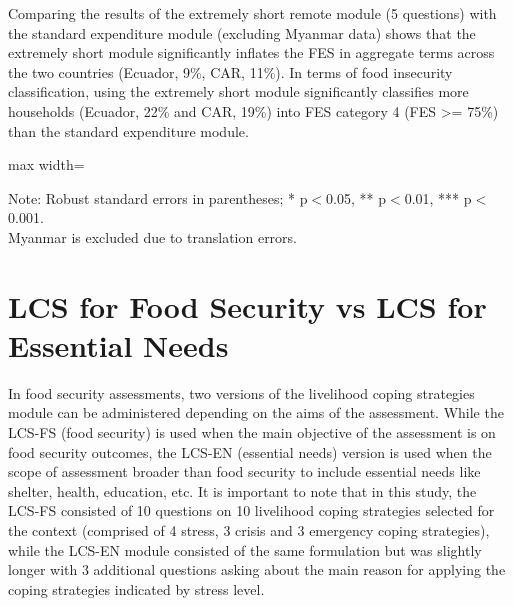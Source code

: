 \documentclass[11pt,harvard]{article}
\begin{document}
Comparing the results of the extremely short remote module (5 questions) with the standard expenditure module (excluding Myanmar data) shows that the extremely short module significantly inflates the FES in aggregate terms across the two countries (Ecuador, 9\%, CAR, 11\%). In terms of food insecurity classification, using the extremely short module significantly classifies more households (Ecuador, 22\% and CAR, 19\%) into FES category 4 (FES >= 75\%) than the standard expenditure module.
	
	\begin{table}[htbp]
		\centering
		\begin{adjustbox}{max width=\textwidth}
			\begin{threeparttable}
				\caption{Impact of Module Length on Expenditure and FES: F2F vs. Remote Short}
				\scriptsize
				 
				\label{tab:FES_F2F_Short_ECU_CAR}
				\begin{tablenotes}
					\item Note: Robust standard errors in parentheses; * p$<$0.05, ** p$<$0.01, *** p$<$0.001. \\
					Myanmar is excluded due to translation errors.
				\end{tablenotes}
			\end{threeparttable}
		\end{adjustbox}
	\end{table}
	
	
\pagebreak
	
\section{LCS for Food Security vs LCS for Essential Needs}
	
In food security assessments, two versions of the livelihood coping strategies module can be administered depending on the aims of the assessment. While the LCS-FS (food security) is used when the main objective of the assessment is on food security outcomes, the LCS-EN (essential needs) version is used when the scope of assessment broader than food security to include essential needs like shelter, health, education, etc. It is important to note that in this study, the LCS-FS consisted of 10 questions on 10 livelihood coping strategies selected for the context (comprised of 4 stress, 3 crisis and 3 emergency coping strategies), while the LCS-EN module consisted of the same formulation but was slightly longer with 3 additional questions asking about the main reason for applying the coping strategies indicated by stress level.
\end{document}
